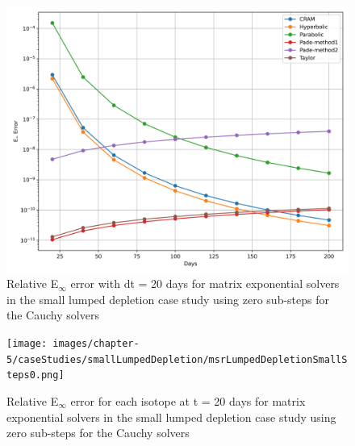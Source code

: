 \begin{figure}[p]
    \centering
    \includegraphics[width=5in]{images/chapter-5/caseStudies/smallLumpedDepletion/msrSmallLumpDepletionEinfErrorerrorSteps0.png}
    \caption{Relative E$_{\infty}$ error with dt = 20 days for matrix exponential solvers in the small lumped depletion case study using zero sub-steps for the Cauchy solvers}
    \label{fig:small_lumped_depletion_Einf_steps0}
\end{figure}

\clearpage

\begin{figure}[p]
    \centering
    \texttt{[image: images/chapter-5/caseStudies/smallLumpedDepletion/msrLumpedDepletionSmallSteps0.png]}
    \caption{Relative E$_{\infty}$ error for each isotope at t = 20 days for matrix exponential solvers in the small lumped depletion case study using zero sub-steps for the Cauchy solvers}
    \label{fig:small_lumped_depletion_species_errors}
\end{figure}

\clearpage

